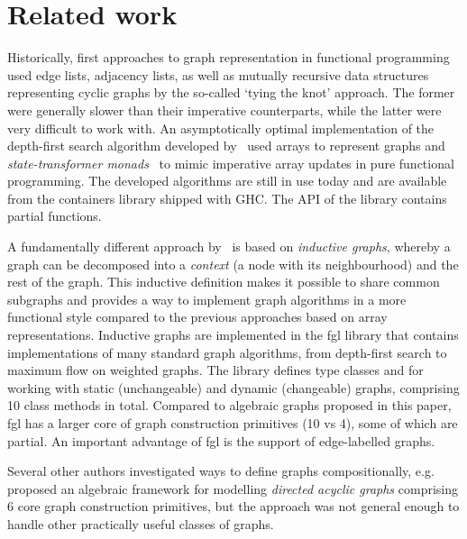 \section{Related work}\label{sec-related}

Historically, first approaches to graph representation in functional programming
used edge lists, adjacency lists, as well as mutually recursive data structures
representing cyclic graphs by the so-called `tying the knot' approach. The former
were generally slower
than their imperative counterparts, while the latter were very difficult to
work with. An asymptotically optimal implementation of the depth-first search
algorithm developed by~\citet{1995_king_graphs} used arrays to represent graphs
and \emph{state-transformer monads}~\cite{1994_launchbury_st} to mimic imperative array
updates in pure functional programming. The developed algorithms are still in
use today and are available from the \textsf{containers} library shipped with GHC.
The API of the library contains partial functions.

A fundamentally different approach by~\citet{2001_erwig_inductive} is based
on \emph{inductive graphs}, whereby a graph can be decomposed into a \emph{context}
(a node with its neighbourhood) and the rest of the graph. This inductive
definition makes it possible to share common subgraphs and provides a way to
implement graph algorithms in a more functional style compared to the previous
approaches based on array representations. Inductive graphs are implemented in
the \textsf{fgl} library that contains implementations of many standard graph
algorithms, from depth-first search to maximum flow on weighted graphs. The library
defines type classes  and  for working with static
(unchangeable) and dynamic (changeable) graphs, comprising 10 class methods in total.
Compared to algebraic graphs proposed in this paper, \textsf{fgl} has a larger
core of graph construction primitives (10 vs 4), some of which are partial. An
important advantage of \textsf{fgl} is the support of edge-labelled graphs.

Several other authors investigated ways to define graphs compositionally,
e.g.~\citet{1995_gibbons_algebra} proposed an algebraic framework for modelling
\emph{directed acyclic graphs} comprising 6 core graph construction primitives,
but the approach was not general enough to handle other practically useful classes
of graphs.

